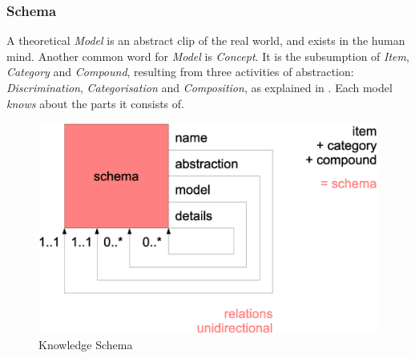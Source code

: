 %
%
%
%
%
%
%

\subsubsection{Schema}
\label{schema_heading}

A theoretical \emph{Model} is an abstract clip of the real world, and exists in
the human mind. Another common word for \emph{Model} is \emph{Concept}. It is
the subsumption of \emph{Item}, \emph{Category} and \emph{Compound}, resulting
from three activities of abstraction: \emph{Discrimination},
\emph{Categorisation} and \emph{Composition}, as explained in \cite{heller2004}.
Each model \emph{knows} about the parts it consists of.

\begin{figure}[ht]
    \begin{center}
        \includegraphics[scale=0.2]{vector/schema.eps}
        \caption{Knowledge Schema}
        \label{schema_figure}
    \end{center}
\end{figure}

